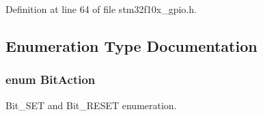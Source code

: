 Definition at line 64 of file stm32f10x\+\_\+gpio.\+h.



\subsection{Enumeration Type Documentation}
\subsubsection[{\texorpdfstring{Bit\+Action}{BitAction}}]{\setlength{\rightskip}{0pt plus 5cm}enum {\bf Bit\+Action}}\hypertarget{group___g_p_i_o___exported___types_ga176130b21c0e719121470a6042d4cf19}{}\label{group___g_p_i_o___exported___types_ga176130b21c0e719121470a6042d4cf19}


Bit\+\_\+\+S\+ET and Bit\+\_\+\+R\+E\+S\+ET enumeration. 

